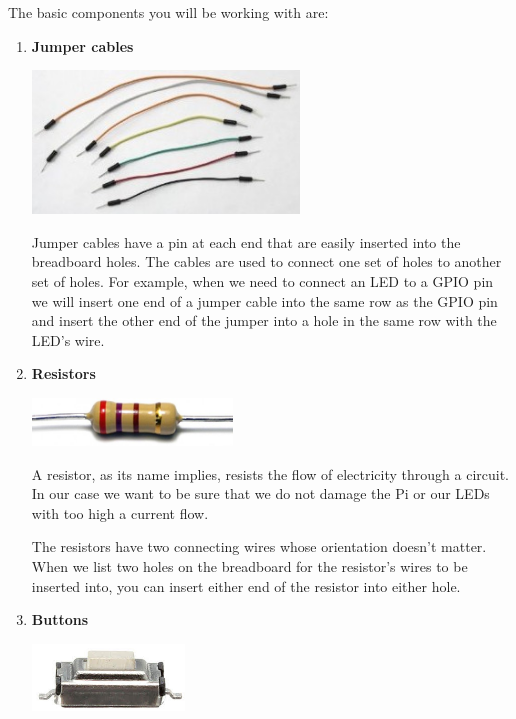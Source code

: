 \pagebreak

The basic components you will be working with are:

\begin{enumerate}
\item \textbf{Jumper cables}


\beforefig
\centerline{\includegraphics[height=1.50in]{pi_images/breadboard-jumper-cables.jpg}}
\afterfig

Jumper cables have a pin at each end that are easily inserted into the breadboard holes. The cables are used to connect one set of holes to another set of holes. For example, when we need to connect an LED to a GPIO pin we will insert one end of a jumper cable into the same row as the GPIO pin and insert the other end of the jumper into a hole in the same row with the LED's wire.

\item \textbf{Resistors}

\beforefig
\centerline{\includegraphics[height=0.50in]{pi_images/resistor3-500x500.jpg}}
\afterfig

A resistor, as its name implies, resists the flow of electricity through a circuit. In our case we want to be sure that we do not damage the Pi or our LEDs with too high a current flow.

The resistors have two connecting wires whose orientation doesn't matter. When we list two holes on the breadboard for the resistor's wires to be inserted into, you can insert either end of the resistor into either hole.

\item \textbf{Buttons}


\beforefig
\centerline{\includegraphics[height=0.70in]{pi_images/button_large.jpg}}
\afterfig


\end{enumerate}
